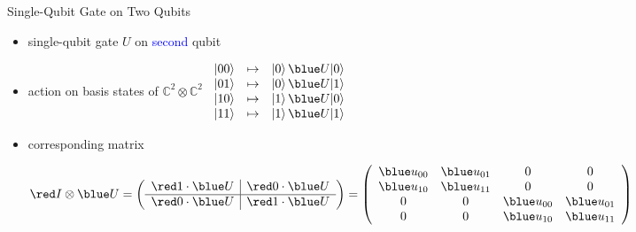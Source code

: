 \documentclass[slideColor]{prosper}
\renewcommand{\>}{\rangle}
\newcommand{\<}{\langle}
\begin{document}
\begin{slide}{Single-Qubit Gate on Two Qubits}
\vspace{-0.2cm}
\begin{itemize}
\item single-qubit gate $U$ on \textcolor{blue}{second} qubit\quad
{}

\bigskip
\item action on basis states of $\mathbb{C}^2\otimes\mathbb{C}^2$\quad
$
\begin{array}{ccc}
|00\> & \mapsto & |0\>\, {\blue U}|0\>\\
|01\> & \mapsto & |0\>\, {\blue U}|1\>\\
|10\> & \mapsto & |1\>\, {\blue U}|0\>\\
|11\> & \mapsto & |1\>\, {\blue U}|1\>
\end{array}
$

\medskip
\item corresponding matrix

$ {\red I}\otimes {\blue U}
=
\left(
\begin{array}{c|c}
{\red 1} \cdot {\blue U} & {\red 0} \cdot {\blue U} \\ \hline
{\red 0} \cdot {\blue U} & {\red 1} \cdot {\blue U}
\end{array}
\right)
=
\left(
\begin{array}{cccc}
{\blue u_{00}} & {\blue u_{01}} & 0      & 0 \\
{\blue u_{10}} & {\blue u_{11}} & 0      & 0 \\
0              & 0              & {\blue u_{00}} & {\blue u_{01}} \\
0              & 0              & {\blue u_{10}} & {\blue u_{11}}
\end{array}
\right)
$
\end{itemize}
\end{slide}

\end{document}

